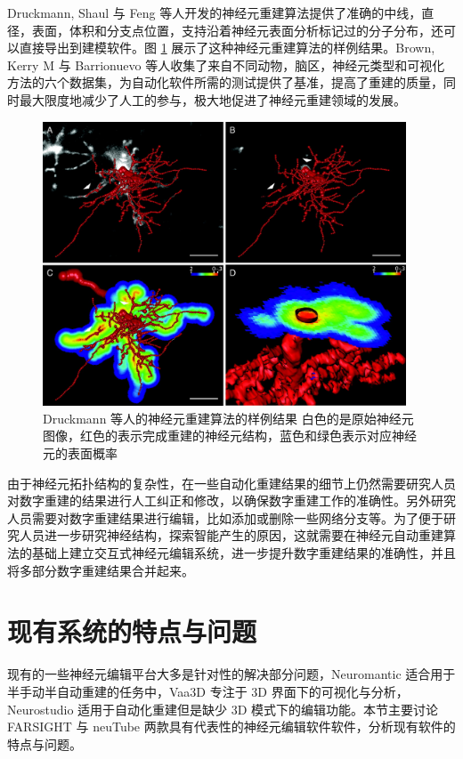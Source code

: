 Druckmann, Shaul 与 Feng 等人开发的神经元重建算法提供了准确的中线，直径，表面，体积和分支点位置，支持沿着神经元表面分析标记过的分子分布，还可以直接导出到建模软件。图 \ref{Druckmann} 展示了这种神经元重建算法的样例结果。Brown, Kerry M 与 Barrionuevo 等人收集了来自不同动物，脑区，神经元类型和可视化方法的六个数据集，为自动化软件所需的测试提供了基准，提高了重建的质量，同时最大限度地减少了人工的参与，极大地促进了神经元重建领域的发展。

\begin{figure}[!ht]
\centering
\includegraphics[width=108mm]{images/Druckmann}
\caption{Druckmann 等人的神经元重建算法的样例结果 白色的是原始神经元图像，红色的表示完成重建的神经元结构，蓝色和绿色表示对应神经元的表面概率}
\label{Druckmann}
\end{figure}

由于神经元拓扑结构的复杂性，在一些自动化重建结果的细节上仍然需要研究人员对数字重建的结果进行人工纠正和修改，以确保数字重建工作的准确性。另外研究人员需要对数字重建结果进行编辑，比如添加或删除一些网络分支等。为了便于研究人员进一步研究神经结构，探索智能产生的原因，这就需要在神经元自动重建算法的基础上建立交互式神经元编辑系统，进一步提升数字重建结果的准确性，并且将多部分数字重建结果合并起来。

\section{现有系统的特点与问题}
现有的一些神经元编辑平台大多是针对性的解决部分问题，Neuromantic  适合用于半手动半自动重建的任务中，Vaa3D  专注于 3D 界面下的可视化与分析，Neurostudio  适用于自动化重建但是缺少 3D 模式下的编辑功能。本节主要讨论 FARSIGHT  与 neuTube  两款具有代表性的神经元编辑软件软件，分析现有软件的特点与问题。

